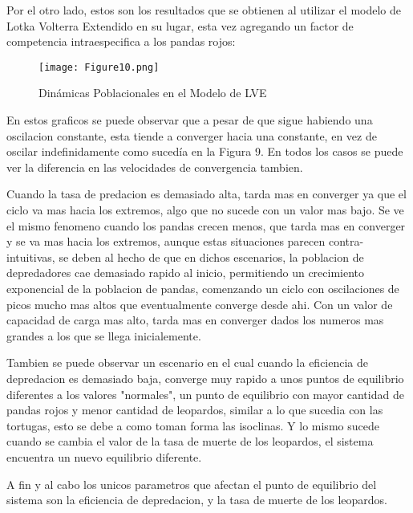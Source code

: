 \documentclass{article}
\begin{document}
\noindent Por el otro lado, estos son los resultados que se obtienen al utilizar el modelo de Lotka Volterra Extendido en su lugar, esta vez agregando un factor de competencia intraespecifica a los pandas rojos:

\begin{figure}[ht]
    \centering
    \caption{Dinámicas Poblacionales en el Modelo de LVE}
    \texttt{[image: Figure10.png]}
    \label{fig:Image 1.1}
\end{figure}

\vspace{17\baselineskip}

\noindent En estos graficos se puede observar que a pesar de que sigue habiendo una oscilacion constante, esta tiende a converger hacia una constante, en vez de oscilar indefinidamente como sucedía en la Figura 9. En todos los casos se puede ver la diferencia en las velocidades de convergencia tambien. \vspace{1\baselineskip}

\noindent Cuando la tasa de predacion es demasiado alta, tarda mas en converger ya que el ciclo va mas hacia los extremos, algo que no sucede con un valor mas bajo. Se ve el mismo fenomeno cuando los pandas crecen menos, que tarda mas en converger y se va mas hacia los extremos, aunque estas situaciones parecen contra-intuitivas, se deben al hecho de que en dichos escenarios, la poblacion de depredadores cae demasiado rapido al inicio, permitiendo un crecimiento exponencial de la poblacion de pandas, comenzando un ciclo con oscilaciones de picos mucho mas altos que eventualmente converge desde ahi. Con un valor de capacidad de carga mas alto, tarda mas en converger dados los numeros mas grandes a los que se llega inicialemente.

\vspace{1\baselineskip}

\noindent Tambien se puede observar un escenario en el cual cuando la eficiencia de depredacion es demasiado baja, converge muy rapido a unos puntos de equilibrio diferentes a los valores "normales", un punto de equilibrio con mayor cantidad de pandas rojos y menor cantidad de leopardos, similar a lo que sucedia con las tortugas, esto se debe a como toman forma las isoclinas. Y lo mismo sucede cuando se cambia el valor de la tasa de muerte de los leopardos, el sistema encuentra un nuevo equilibrio diferente. \vspace{1\baselineskip}

\noindent A fin y al cabo los unicos parametros que afectan el punto de equilibrio del sistema son la eficiencia de depredacion, y la tasa de muerte de los leopardos.
\vspace{1\baselineskip}
\end{document}
